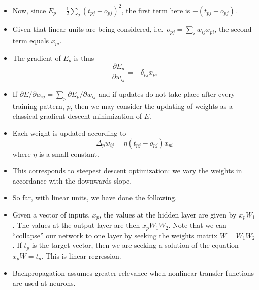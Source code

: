 \documentclass[a4,dvips]{seminar}
\begin{document}
\begin{slide}
\begin{itemize}
\item Now, since $E_p = \frac{1}{2} \sum_j (t_{pj} - o_{pj})^2$, the first
term here is $-(t_{pj} - o_{pj})$.  
\item Given that linear units are 
being considered, i.e.\ $o_{pj} = \sum_i w_{ij} x_{pi}$, the second
term equals $x_{pi}$.  
\item The gradient of $E_p$ is thus
$$ \frac{\partial E_p}{\partial w_{ij}} = - \delta_{pj} x_{pi}$$
\item 
If $\partial E/\partial w_{ij} = \sum_p \partial E_p / \partial w_{ij}$ and 
if updates do not take place after every training pattern, $p$, then we may
consider the updating of weights as a classical gradient descent minimization
of $E$.  
\item Each weight is updated according to
$$ \Delta_p w_{ij} = \eta (t_{pj} - o_{pj}) x_{pi} $$
where $\eta$ is a small constant.  
\item This corresponds to steepest descent
optimization: we vary the weights in accordance with the downwards slope.
\item So far, with linear units, we have done the following.
\item  Given a vector of inputs, $x_p$, the values
at the hidden layer are given by $x_p W_1$.  The values at the output 
layer are then $x_p W_1 W_2$.  Note that we can ``collapse'' our network
to one layer by seeking the weights matrix $W = W_1 W_2$.  If $t_p$ is the 
target vector, then  we are seeking a solution of the equation 
$x_p W = t_p$.  This is linear regression.
\item Backpropagation assumes greater relevance when 
nonlinear transfer functions
are used at neurons.
\end{itemize}
\end{slide}
\end{document}
